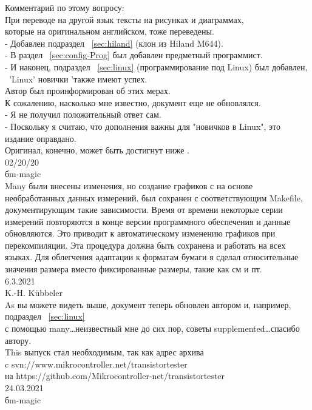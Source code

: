 Комментарий по этому вопросу:
\vspace*{0.3cm}
\\ При переводе на другой язык тексты на рисунках и диаграммах,
\\ которые на оригинальном английском, тоже переведены.
\\ - Добавлен подраздел ~\ref{sec:hiland} (клон из Hiland M644).
\\ - В раздел ~\ref{sec:config-Prog} был добавлен предметный программист.
\\ - И наконец, подраздел ~\ref{sec:linux} (программирование под Linux) был добавлен,
\ 'Linux' новички 'также имеют успех.
\vspace*{0.3em}
\\ Автор был проинформирован об этих мерах.
\\ К сожалению, насколько мне известно, документ еще не обновлялся.
\\ - Я не получил положительный ответ сам.
\\ - Поскольку я считаю, что дополнения важны для "новичков в Linux", это издание оправдано.
\vspace*{0.3em}
\\ Оригинал, конечно, может быть достигнут ниже \cite{khk}.
\vspace*{0.3em}
\\ 02/20/20
\\ бm-magic
\vspace*{0.3em}
\\Many были внесены изменения, но создание графиков с  на основе необработанных данных измерений.
был сохранен с соответствующим Makefile, документирующим такие зависимости.
Время от времени некоторые серии измерений повторяются в конце версии программного обеспечения и
данные обновляются. Это приводит к автоматическому изменению графиков при перекомпиляции.
Эта процедура должна быть сохранена и работать на всех языках.
Для облегчения адаптации к форматам бумаги я сделал относительные значения размера вместо
фиксированные размеры, такие как см и пт.
\vspace*{0.2em}
\\6.3.2021
\\K.-H. Kübbeler
\vspace*{0.2em}
\\As вы можете видеть выше, документ теперь обновлен автором и, например, подраздел ~\ref{sec:linux}
\\с помощью many\dots неизвестный мне до сих пор, советы supplemented\dots спасибо автору.
\\This выпуск стал необходимым, так как адрес архива 
\\c svn://www.mikrocontroller.net/transistortester
\\на https://github.com/Mikrocontroller-net/transistortester ~\cite{tt}
\vspace*{0.2em}
\\24.03.2021 
\\ бm-magic

